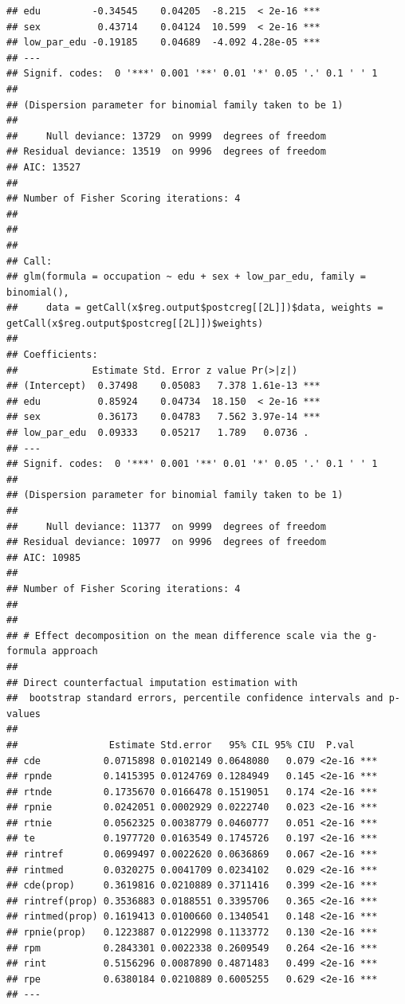 \documentclass[
]{book}
\begin{document}
\begin{verbatim}
## edu         -0.34545    0.04205  -8.215  < 2e-16 ***
## sex          0.43714    0.04124  10.599  < 2e-16 ***
## low_par_edu -0.19185    0.04689  -4.092 4.28e-05 ***
## ---
## Signif. codes:  0 '***' 0.001 '**' 0.01 '*' 0.05 '.' 0.1 ' ' 1
## 
## (Dispersion parameter for binomial family taken to be 1)
## 
##     Null deviance: 13729  on 9999  degrees of freedom
## Residual deviance: 13519  on 9996  degrees of freedom
## AIC: 13527
## 
## Number of Fisher Scoring iterations: 4
## 
## 
## 
## Call:
## glm(formula = occupation ~ edu + sex + low_par_edu, family = binomial(), 
##     data = getCall(x$reg.output$postcreg[[2L]])$data, weights = getCall(x$reg.output$postcreg[[2L]])$weights)
## 
## Coefficients:
##             Estimate Std. Error z value Pr(>|z|)    
## (Intercept)  0.37498    0.05083   7.378 1.61e-13 ***
## edu          0.85924    0.04734  18.150  < 2e-16 ***
## sex          0.36173    0.04783   7.562 3.97e-14 ***
## low_par_edu  0.09333    0.05217   1.789   0.0736 .  
## ---
## Signif. codes:  0 '***' 0.001 '**' 0.01 '*' 0.05 '.' 0.1 ' ' 1
## 
## (Dispersion parameter for binomial family taken to be 1)
## 
##     Null deviance: 11377  on 9999  degrees of freedom
## Residual deviance: 10977  on 9996  degrees of freedom
## AIC: 10985
## 
## Number of Fisher Scoring iterations: 4
## 
## 
## # Effect decomposition on the mean difference scale via the g-formula approach
##  
## Direct counterfactual imputation estimation with 
##  bootstrap standard errors, percentile confidence intervals and p-values 
##  
##                Estimate Std.error   95% CIL 95% CIU  P.val    
## cde           0.0715898 0.0102149 0.0648080   0.079 <2e-16 ***
## rpnde         0.1415395 0.0124769 0.1284949   0.145 <2e-16 ***
## rtnde         0.1735670 0.0166478 0.1519051   0.174 <2e-16 ***
## rpnie         0.0242051 0.0002929 0.0222740   0.023 <2e-16 ***
## rtnie         0.0562325 0.0038779 0.0460777   0.051 <2e-16 ***
## te            0.1977720 0.0163549 0.1745726   0.197 <2e-16 ***
## rintref       0.0699497 0.0022620 0.0636869   0.067 <2e-16 ***
## rintmed       0.0320275 0.0041709 0.0234102   0.029 <2e-16 ***
## cde(prop)     0.3619816 0.0210889 0.3711416   0.399 <2e-16 ***
## rintref(prop) 0.3536883 0.0188551 0.3395706   0.365 <2e-16 ***
## rintmed(prop) 0.1619413 0.0100660 0.1340541   0.148 <2e-16 ***
## rpnie(prop)   0.1223887 0.0122998 0.1133772   0.130 <2e-16 ***
## rpm           0.2843301 0.0022338 0.2609549   0.264 <2e-16 ***
## rint          0.5156296 0.0087890 0.4871483   0.499 <2e-16 ***
## rpe           0.6380184 0.0210889 0.6005255   0.629 <2e-16 ***
## ---

\end{verbatim}
\end{document}
